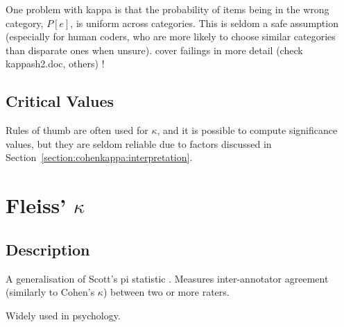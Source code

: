 \documentclass[11pt]{article}
\begin{document}
One problem with kappa is that the probability of items being in the wrong category, $P[e]$, is uniform across categories.  This is seldom a safe assumption (especially for human coders, who are more likely to choose similar categories than disparate ones when unsure).
{\color{red} cover failings in more detail (check kappash2.doc, others) !}

\subsection{Critical Values}
Rules of thumb are often used for $\kappa$, and it is possible to compute significance values, but they are seldom reliable due to factors discussed in Section~\ref{section:cohenkappa:interpretation}.





\section{Fleiss' $\kappa$} %
\subsection{Description}
A generalisation of Scott's pi statistic %
.  Measures inter-annotator agreement (similarly to Cohen's $\kappa$) between two or more raters.

Widely used in psychology.

\cite{fleiss1971measuring}


\end{document}
